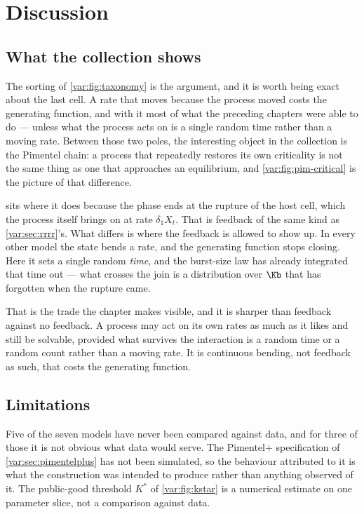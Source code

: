
\section{Discussion}
\label{var:sec:discussion}

\subsection{What the collection shows}
\label{var:sec:pattern}

The sorting of \cref{var:fig:taxonomy} is the argument, and it is worth being
exact about the last cell. A rate that moves because the process moved costs
the generating function, and with it most of what the preceding chapters were
able to do --- unless what the process acts on is a single random time rather
than a moving rate. Between those two poles, the interesting object in the
collection is the Pimentel chain: a process that repeatedly restores its own
criticality is not the same thing as one that approaches an equilibrium, and
\cref{var:fig:pim-critical} is the picture of that difference.

 sits where it does because the phase ends at the
rupture of the host cell, which the process itself brings on at rate
$\delta_1 X_t$. That is feedback of the same kind as \cref{var:sec:rrrr}'s.
What differs is where the feedback is allowed to show up. In every other
model the state bends a rate, and the generating function stops closing.
Here it sets a single random \emph{time}, and the burst-size law has already
integrated that time out --- what crosses the join is a distribution over
$\Kb$ that has forgotten when the rupture came.

That is the trade the chapter makes visible, and it is sharper than feedback
against no feedback. A process may act on its own rates as much as it likes
and still be solvable, provided what survives the interaction is a random
time or a random count rather than a moving rate. It is continuous bending,
not feedback as such, that costs the generating function.

\subsection{Limitations}
\label{var:sec:limitations}

Five of the seven models have never been compared against data, and for three
of those it is not obvious what data would serve. The Pimentel+ specification
of \cref{var:sec:pimentelplus} has not been simulated, so the behaviour
attributed to it is what the construction was intended to produce rather than
anything observed of it. The public-good threshold $K^\ast$ of
\cref{var:fig:kstar} is a numerical estimate on one parameter slice, not a
comparison against data.

